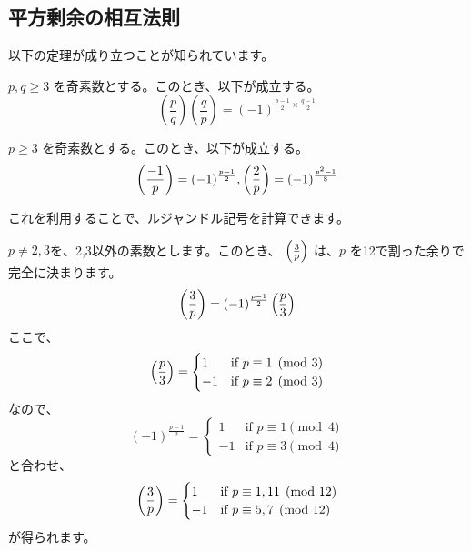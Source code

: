 \documentclass{jsarticle}
\begin{document}
  \subsection{平方剰余の相互法則}
  以下の定理が成り立つことが知られています。
  \begin{theorem}[平方剰余の相互法則]
   $p, q \ge 3$ を奇素数とする。このとき、以下が成立する。
   \begin{displaymath}
    \left(\frac{p}{q}\right)\left(\frac{q}{p}\right) = (-1)^{\frac{p-1}{2} \times \frac{q-1}{2}}
   \end{displaymath}
  \end{theorem}
  \begin{theorem}[補充法則]
   $p \ge 3$ を奇素数とする。このとき、以下が成立する。
   \begin{displaymath}
    \left(\frac{-1}{p}\right) = (-1)^{\frac{p-1}{2}},
    \left(\frac{2}{p}\right) = (-1)^{\frac{p^2-1}{8}}
   \end{displaymath}
  \end{theorem}
  これを利用することで、ルジャンドル記号を計算できます。
  \begin{example}
   \label{ex:legendre-3}
   $p \neq 2,3$を、2,3以外の素数とします。このとき、
   $\left(\frac{3}{p}\right)$ は、$p$ を12で割った余りで完全に決まります。
   \begin{displaymath}
    \left(\frac{3}{p}\right) = (-1)^{\frac{p-1}{2}}\left(\frac{p}{3}\right)
   \end{displaymath}
   ここで、
   \begin{displaymath}
    \left(\frac{p}{3}\right) = \begin{cases}
		       1 & \mbox{if }p\equiv 1 \pmod 3 \\
		       -1 & \mbox{if }p\equiv 2 \pmod 3
		      \end{cases}
   \end{displaymath}
   なので、
   \begin{displaymath}
    (-1)^{\frac{p-1}{2}} = \begin{cases}
			    1 & \mbox{if }p \equiv 1 \pmod 4 \\
			    -1 & \mbox{if }p \equiv 3 \pmod 4
			   \end{cases}
   \end{displaymath}
   と合わせ、
   \begin{displaymath}
    \left(\frac{3}{p}\right) = \begin{cases}
		       1 & \mbox{if }p\equiv 1,11 \pmod{12} \\
		       -1 & \mbox{if }p\equiv 5,7 \pmod{12}
		      \end{cases}
   \end{displaymath}
   が得られます。
  \end{example}
\end{document}
